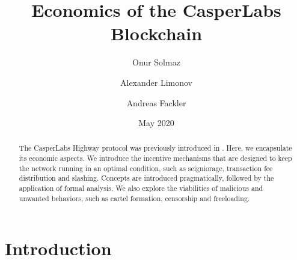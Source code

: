 \documentclass[12pt]{article}
\title{Economics of the CasperLabs Blockchain}
\author{Onur Solmaz}
\author{Alexander Limonov}
\author{Andreas Fackler}
\affil{CasperLabs}
\date{May 2020}
\begin{document}
\maketitle

\begin{abstract}
  The CasperLabs Highway protocol was previously introduced in \cite{kane2019casperlabs}. Here, we encapsulate its economic aspects. We introduce the incentive mechanisms that are designed to keep the network running in an optimal condition, such as seigniorage, transaction fee distribution and slashing. Concepts are introduced pragmatically, followed by the application of formal analysis. We also explore the viabilities of malicious and unwanted behaviors, such as cartel formation, censorship and freeloading.
\end{abstract}

\tableofcontents
\pagebreak

\section*{Introduction}



\newpage

\printbibliography
\end{document}
